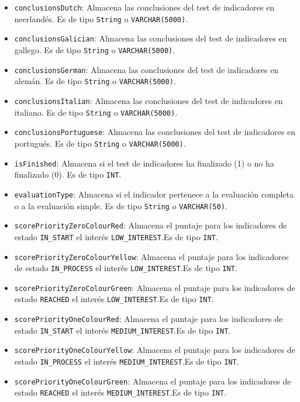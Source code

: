 \begin{itemize}
\begin{itemize}
      \item \texttt{conclusionsDutch}: Almacena las conclusiones del test de indicadores en neerlandés. Es de tipo \texttt{String} o \texttt{VARCHAR(5000)}.
      \item \texttt{conclusionsGalician}: Almacena las conclusiones del test de indicadores en gallego. Es de tipo \texttt{String} o \texttt{VARCHAR(5000)}.
      \item \texttt{conclusionsGerman}: Almacena las conclusiones del test de indicadores en alemán. Es de tipo \texttt{String} o \texttt{VARCHAR(5000)}.
      \item \texttt{conclusionsItalian}: Almacena las conclusiones del test de indicadores en italiano. Es de tipo \texttt{String} o \texttt{VARCHAR(5000)}.
      \item \texttt{conclusionsPortuguese}: Almacena las conclusiones del test de indicadores en portugués. Es de tipo \texttt{String} o \texttt{VARCHAR(5000)}.
      \item \texttt{isFinished}: Almacena si el test de indicadores ha finalizado (1) o no ha finalizado (0). Es de tipo \texttt{INT}.
      \item \texttt{evaluationType}: Almacena si el indicador pertenece a la evaluación completa o a la evaluación simple. Es de tipo \texttt{String} o \texttt{VARCHAR(50)}.
      \item \texttt{scorePriorityZeroColourRed}: Almacena el puntaje para los indicadores de estado \texttt{IN\_START} el interés \texttt{LOW\_INTEREST}.Es de tipo \texttt{INT}.
      \item \texttt{scorePriorityZeroColourYellow}: Almacena el puntaje para los indicadores de estado \texttt{IN\_PROCESS} el interés \texttt{LOW\_INTEREST}.Es de tipo \texttt{INT}.
      \item \texttt{scorePriorityZeroColourGreen}: Almacena el puntaje para los indicadores de estado \texttt{REACHED} el interés \texttt{LOW\_INTEREST}.Es de tipo \texttt{INT}.
      \item \texttt{scorePriorityOneColourRed}: Almacena el puntaje para los indicadores de estado \texttt{IN\_START} el interés \texttt{MEDIUM\_INTEREST}.Es de tipo \texttt{INT}.
      \item \texttt{scorePriorityOneColourYellow}: Almacena el puntaje para los indicadores de estado \texttt{IN\_PROCESS} el interés \texttt{MEDIUM\_INTEREST}.Es de tipo \texttt{INT}.
      \item \texttt{scorePriorityOneColourGreen}: Almacena el puntaje para los indicadores de estado \texttt{REACHED} el interés \texttt{MEDIUM\_INTEREST}.Es de tipo \texttt{INT}.

\end{itemize}
\end{itemize}
